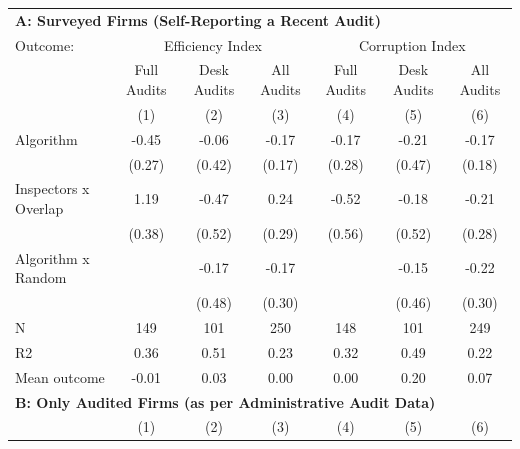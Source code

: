 \begin{tabular}{lccc|ccc} \toprule
\multicolumn{7}{l}{\textbf{A: Surveyed Firms (Self-Reporting a Recent Audit)}} \\ \multicolumn{1}{l}{Outcome:} & \multicolumn{3}{c}{Efficiency Index} & \multicolumn{3}{c}{Corruption Index} \\ \multicolumn{1}{l}{} & Full Audits & Desk Audits & All Audits & Full Audits & Desk Audits & All Audits \\ \multicolumn{1}{l}{} & (1) & (2) & (3) & (4) & (5) & (6) \\ \midrule
Algorithm   &       -0.45\sym{*}  &       -0.06         &       -0.17         &       -0.17         &       -0.21         &       -0.17         \\
            &      (0.27)         &      (0.42)         &      (0.17)         &      (0.28)         &      (0.47)         &      (0.18)         \\
\addlinespace
Inspectors x Overlap&        1.19\sym{***}&       -0.47         &        0.24         &       -0.52         &       -0.18         &       -0.21         \\
            &      (0.38)         &      (0.52)         &      (0.29)         &      (0.56)         &      (0.52)         &      (0.28)         \\
\addlinespace
Algorithm x Random&                     &       -0.17         &       -0.17         &                     &       -0.15         &       -0.22         \\
            &                     &      (0.48)         &      (0.30)         &                     &      (0.46)         &      (0.30)         \\
\midrule
N           &         149         &         101         &         250         &         148         &         101         &         249         \\
R2          &        0.36         &        0.51         &        0.23         &        0.32         &        0.49         &        0.22         \\
Mean outcome&       -0.01         &        0.03         &        0.00         &        0.00         &        0.20         &        0.07         \\

\midrule \multicolumn{7}{l}{\textbf{B: Only Audited Firms (as per Administrative Audit Data)}} \\ \multicolumn{1}{l}{} & (1) & (2) & (3) & (4) & (5) & (6) \\ \midrule


\end{tabular}
